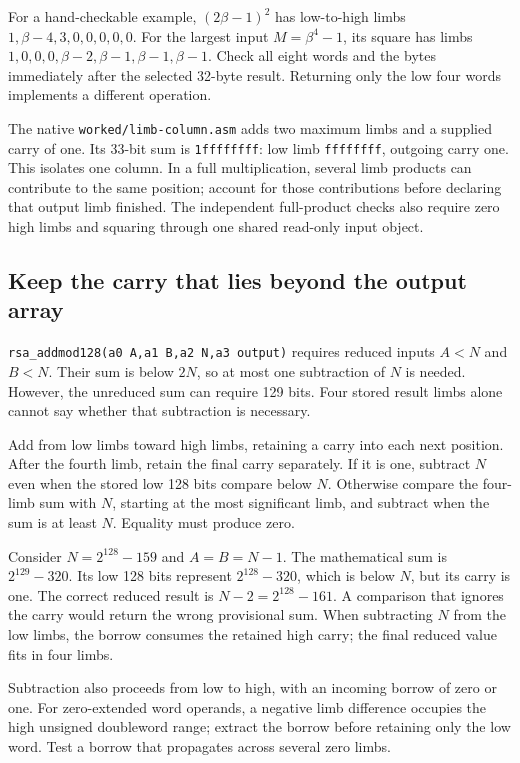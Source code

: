 For a hand-checkable example, $(2\beta-1)^2$ has low-to-high limbs
$1,\beta-4,3,0,0,0,0,0$. For the largest input $M=\beta^4-1$, its square has limbs
$1,0,0,0,\beta-2,\beta-1,\beta-1,\beta-1$. Check all eight words and the bytes immediately
after the selected 32-byte result. Returning only the low four words implements
a different operation.



The native \texttt{worked/limb-column.asm} adds two maximum limbs and a
supplied carry of one. Its 33-bit sum is \texttt{1ffffffff}: low limb
\texttt{ffffffff}, outgoing carry one. This isolates one column. In a full
multiplication, several limb products can contribute to the same position;
account for those contributions before declaring that output limb finished.
The independent full-product checks also require zero high limbs and squaring
through one shared read-only input object.

\subsection*{Keep the carry that lies beyond the output array}

\texttt{rsa\_addmod128(a0 A,a1 B,a2 N,a3 output)} requires reduced inputs
$A<N$ and $B<N$. Their sum is below $2N$, so at most one subtraction of $N$
is needed. However, the unreduced sum can require 129 bits. Four stored result
limbs alone cannot say whether that subtraction is necessary.

Add from low limbs toward high limbs, retaining a carry into each next position.
After the fourth limb, retain the final carry separately. If it is one, subtract
$N$ even when the stored low 128 bits compare below $N$. Otherwise compare the
four-limb sum with $N$, starting at the most significant limb, and subtract when
the sum is at least $N$. Equality must produce zero.

Consider $N=2^{128}-159$ and $A=B=N-1$. The mathematical sum is
$2^{129}-320$. Its low 128 bits represent $2^{128}-320$, which is below $N$,
but its carry is one. The correct reduced result is $N-2=2^{128}-161$.
A comparison that ignores the carry would return the wrong provisional sum.
When subtracting $N$ from the low limbs, the borrow consumes the retained high
carry; the final reduced value fits in four limbs.



Subtraction also proceeds from low to high, with an incoming borrow of zero
or one. For zero-extended word operands, a negative limb difference occupies
the high unsigned doubleword range; extract the borrow before retaining only
the low word. Test a borrow that propagates across several zero limbs.

